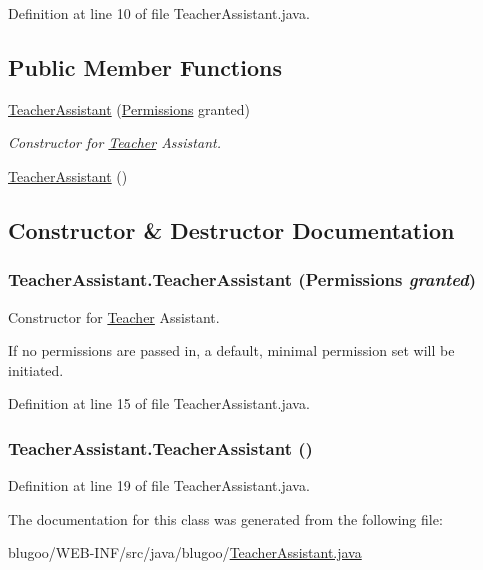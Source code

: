 Definition at line 10 of file TeacherAssistant.java.\subsection*{Public Member Functions}
\begin{CompactItemize}
\item 
\hyperlink{classTeacherAssistant_7bb93bdea2c26e56c3a64afc82493c5e}{TeacherAssistant} (\hyperlink{classPermissions}{Permissions} granted)
\begin{CompactList}\small\item\em Constructor for \hyperlink{classTeacher}{Teacher} Assistant. \item\end{CompactList}\item 
\hyperlink{classTeacherAssistant_14ff34304538db6e1aafaa5aa248f9f1}{TeacherAssistant} ()
\end{CompactItemize}


\subsection{Constructor \& Destructor Documentation}
\hypertarget{classTeacherAssistant_7bb93bdea2c26e56c3a64afc82493c5e}{
\subsubsection{\setlength{\rightskip}{0pt plus 5cm}TeacherAssistant.TeacherAssistant ({\bf Permissions} {\em granted})}}
\label{classTeacherAssistant_7bb93bdea2c26e56c3a64afc82493c5e}


Constructor for \hyperlink{classTeacher}{Teacher} Assistant. 

If no permissions are passed in, a default, minimal permission set will be initiated. 

Definition at line 15 of file TeacherAssistant.java.\hypertarget{classTeacherAssistant_14ff34304538db6e1aafaa5aa248f9f1}{
\subsubsection{\setlength{\rightskip}{0pt plus 5cm}TeacherAssistant.TeacherAssistant ()}}
\label{classTeacherAssistant_14ff34304538db6e1aafaa5aa248f9f1}




Definition at line 19 of file TeacherAssistant.java.

The documentation for this class was generated from the following file:\begin{CompactItemize}
\item 
blugoo/WEB-INF/src/java/blugoo/\hyperlink{TeacherAssistant_8java}{TeacherAssistant.java}\end{CompactItemize}

